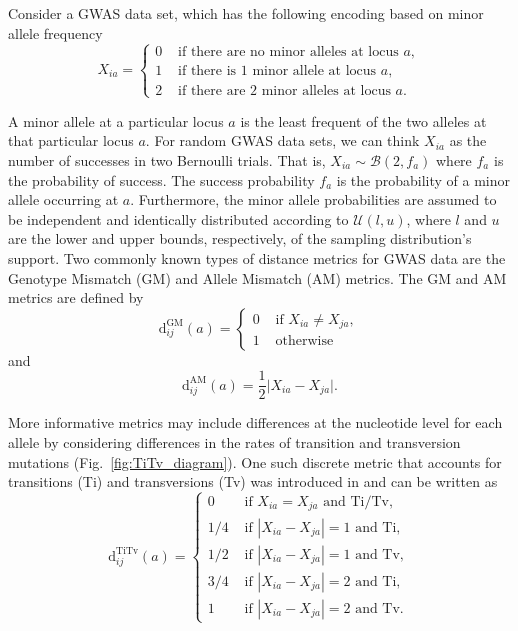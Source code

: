 \documentclass[aos]{imsart}
\begin{document}
Consider a GWAS data set, which has the following encoding based on minor allele frequency
%
\begin{equation}\label{eq:gwas_data}
X_{ia} = \begin{cases}
0 & \text{ if there are no minor alleles at locus } a,  \\
1 & \text{ if there is 1 minor allele at locus } a, \\
2 & \text{ if there are 2 minor alleles at locus } a.
\end{cases}
\end{equation}

A minor allele at a particular locus $a$ is the least frequent of the two alleles at that particular locus $a$. For random GWAS data sets, we can think $X_{ia}$ as the number of successes in two Bernoulli trials. That is, $X_{ia} \sim \mathcal{B}(2,f_a)$ where $f_a$ is the probability of success. The success probability $f_a$ is the probability of a minor allele occurring at $a$. Furthermore, the minor allele probabilities are assumed to be independent and identically distributed according to $\mathcal{U}(l,u)$, where $l$ and $u$ are the lower and upper bounds, respectively, of the sampling distribution's support. Two commonly known types of distance metrics for GWAS data are the Genotype Mismatch (GM) and Allele Mismatch (AM) metrics. The GM and AM metrics are defined by
%
\begin{equation}\label{eq:diff_GM}
\text{d}^\text{GM}_{ij}(a) = \begin{cases} 
0 & \text{ if } X_{ia} \neq X_{ja}, \\
1 & \text{ otherwise}
\end{cases}
\end{equation}
%
and
%
\begin{equation}\label{eq:diff_AM}
\text{d}^\text{AM}_{ij}(a) = \frac{1}{2}\bigl|X_{ia} - X_{ja}\bigr|.
\end{equation}

More informative metrics may include differences at the nucleotide level for each allele by considering differences in the rates of transition and transversion mutations (Fig.~\ref{fig:TiTv_diagram}). One such discrete metric that accounts for transitions (Ti) and transversions (Tv) was introduced in \cite{arabnejad2018} and can be written as
%
\begin{equation}\label{eq:diff_TiTv}
\text{d}^\text{TiTv}_{ij}(a) = \begin{cases}
0 & \text{ if } X_{ia} = X_{ja} \text{ and Ti/Tv}, \\
1/4 & \text{ if } |X_{ia} - X_{ja}|=1 \text{ and Ti}, \\
1/2 & \text{ if } |X_{ia} - X_{ja}|=1 \text{ and Tv}, \\
3/4 & \text{ if } |X_{ia} - X_{ja}|=2 \text{ and Ti}, \\
1 & \text{ if } |X_{ia} - X_{ja}|=2 \text{ and Tv}.
\end{cases}
\end{equation}
\end{document}
